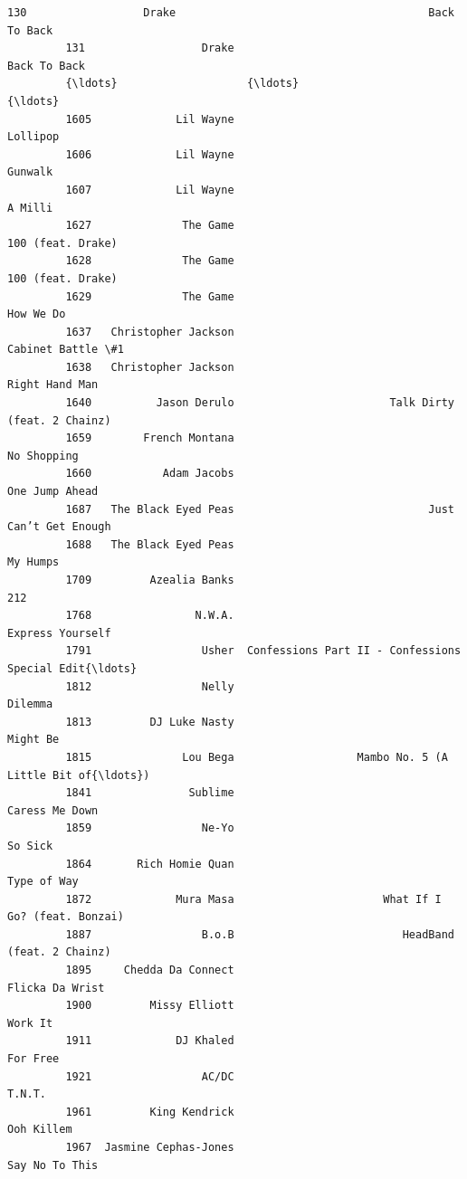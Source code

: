 \documentclass[11pt]{article}
\begin{document}
\begin{Verbatim}[commandchars=\\\{\}]
         130                  Drake                                       Back To Back   
         131                  Drake                                       Back To Back   
         {\ldots}                    {\ldots}                                                {\ldots}   
         1605             Lil Wayne                                           Lollipop   
         1606             Lil Wayne                                            Gunwalk   
         1607             Lil Wayne                                            A Milli   
         1627              The Game                                  100 (feat. Drake)   
         1628              The Game                                  100 (feat. Drake)   
         1629              The Game                                          How We Do   
         1637   Christopher Jackson                                  Cabinet Battle \#1   
         1638   Christopher Jackson                                     Right Hand Man   
         1640          Jason Derulo                        Talk Dirty (feat. 2 Chainz)   
         1659        French Montana                                        No Shopping   
         1660           Adam Jacobs                                     One Jump Ahead   
         1687   The Black Eyed Peas                              Just Can’t Get Enough   
         1688   The Black Eyed Peas                                           My Humps   
         1709         Azealia Banks                                                212   
         1768                N.W.A.                                   Express Yourself   
         1791                 Usher  Confessions Part II - Confessions Special Edit{\ldots}   
         1812                 Nelly                                            Dilemma   
         1813         DJ Luke Nasty                                           Might Be   
         1815              Lou Bega                   Mambo No. 5 (A Little Bit of{\ldots})   
         1841               Sublime                                     Caress Me Down   
         1859                 Ne-Yo                                            So Sick   
         1864       Rich Homie Quan                                        Type of Way   
         1872             Mura Masa                       What If I Go? (feat. Bonzai)   
         1887                 B.o.B                          HeadBand (feat. 2 Chainz)   
         1895     Chedda Da Connect                                    Flicka Da Wrist   
         1900         Missy Elliott                                            Work It   
         1911             DJ Khaled                                           For Free   
         1921                 AC/DC                                             T.N.T.   
         1961         King Kendrick                                         Ooh Killem   
         1967  Jasmine Cephas-Jones                                     Say No To This   
         

\end{Verbatim}
\end{document}
